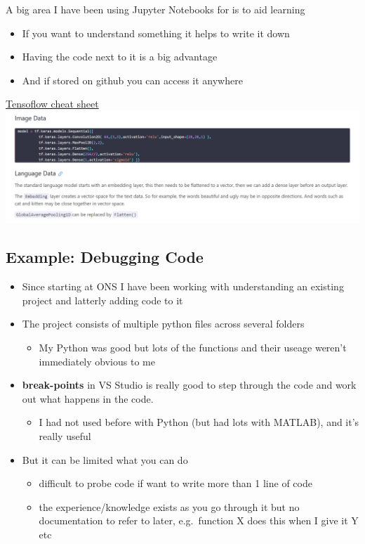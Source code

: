\documentclass[
  letterpaper,
  DIV=11,
  numbers=noendperiod]{scrartcl}
\providecommand{\tightlist}{%
  \setlength{\itemsep}{0pt}\setlength{\parskip}{0pt}}\usepackage{longtable,booktabs,array}
\begin{document}
A big area I have been using Jupyter Notebooks for is to aid learning

\begin{itemize}
\tightlist
\item
  If you want to understand something it helps to write it down
\item
  Having the code next to it is a big advantage
\item
  And if stored on github you can access it anywhere
\end{itemize}

\href{https://thomashsimm.com/tensorflow/2022/09/28/Tensorflow.html}{Tensoflow
cheat sheet} \includegraphics{ghtop_images/tflow.png}

\hypertarget{example-debugging-code}{%
\subsection{Example: Debugging Code}\label{example-debugging-code}}

\begin{itemize}
\tightlist
\item
  Since starting at ONS I have been working with understanding an
  existing project and latterly adding code to it
\item
  The project consists of multiple python files across several folders

  \begin{itemize}
  \tightlist
  \item
    My Python was good but lots of the functions and their useage
    weren't immediately obvious to me
  \end{itemize}
\item
  \textbf{break-points} in VS Studio is really good to step through the
  code and work out what happens in the code.

  \begin{itemize}
  \tightlist
  \item
    I had not used before with Python (but had lots with MATLAB), and
    it's really useful
  \end{itemize}
\item
  But it can be limited what you can do

  \begin{itemize}
  \tightlist
  \item
    difficult to probe code if want to write more than 1 line of code
  \item
    the experience/knowledge exists as you go through it but no
    documentation to refer to later, e.g.~function X does this when I
    give it Y etc
  \end{itemize}
\end{itemize}
\end{document}
